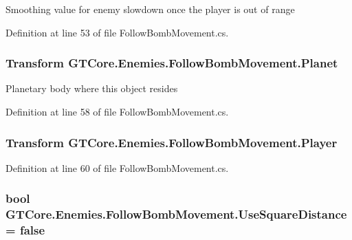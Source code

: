 Smoothing value for enemy slowdown once the player is out of range 



Definition at line 53 of file Follow\+Bomb\+Movement.\+cs.

\hypertarget{class_g_t_core_1_1_enemies_1_1_follow_bomb_movement_a41203fb8ac8a63c736780e054903fea8}{}
\subsubsection[{Planet}]{\setlength{\rightskip}{0pt plus 5cm}Transform G\+T\+Core.\+Enemies.\+Follow\+Bomb\+Movement.\+Planet}\label{class_g_t_core_1_1_enemies_1_1_follow_bomb_movement_a41203fb8ac8a63c736780e054903fea8}


Planetary body where this object resides 



Definition at line 58 of file Follow\+Bomb\+Movement.\+cs.

\hypertarget{class_g_t_core_1_1_enemies_1_1_follow_bomb_movement_adaab5b48a877d03861e6f1e40838306e}{}
\subsubsection[{Player}]{\setlength{\rightskip}{0pt plus 5cm}Transform G\+T\+Core.\+Enemies.\+Follow\+Bomb\+Movement.\+Player}\label{class_g_t_core_1_1_enemies_1_1_follow_bomb_movement_adaab5b48a877d03861e6f1e40838306e}


Definition at line 60 of file Follow\+Bomb\+Movement.\+cs.

\hypertarget{class_g_t_core_1_1_enemies_1_1_follow_bomb_movement_a6acfe7e9ede561ff19f064d5f887b18b}{}
\subsubsection[{Use\+Square\+Distance}]{\setlength{\rightskip}{0pt plus 5cm}bool G\+T\+Core.\+Enemies.\+Follow\+Bomb\+Movement.\+Use\+Square\+Distance = false}\label{class_g_t_core_1_1_enemies_1_1_follow_bomb_movement_a6acfe7e9ede561ff19f064d5f887b18b}


